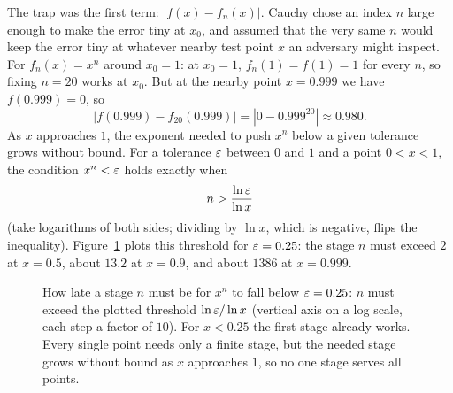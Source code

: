 The trap was the first term: $|f(x) - f_n(x)|$. Cauchy chose an index $n$ large enough to make the error tiny at $x_0$, and assumed that the very same $n$ would keep the error tiny at whatever nearby test point $x$ an adversary might inspect. For $f_n(x) = x^n$ around $x_0 = 1$: at $x_0 = 1$, $f_n(1) = f(1) = 1$ for every $n$, so fixing $n = 20$ works at $x_0$. But at the nearby point $x = 0.999$ we have $f(0.999) = 0$, so
\[
|f(0.999) - f_{20}(0.999)| = |0 - 0.999^{20}| \approx 0.980.
\]
As $x$ approaches $1$, the exponent needed to push $x^n$ below a given tolerance grows without bound. For a tolerance $\varepsilon$ between $0$ and $1$ and a point $0 < x < 1$, the condition $x^n < \varepsilon$ holds exactly when
\[
n > \frac{\ln \varepsilon}{\ln x}
\]
(take logarithms of both sides; dividing by $\ln x$, which is negative, flips the inequality). Figure~\ref{fig:qo-stage-needed} plots this threshold for $\varepsilon = 0.25$: the stage $n$ must exceed $2$ at $x = 0.5$, about $13.2$ at $x = 0.9$, and about $1386$ at $x = 0.999$.

\begin{figure}[htbp]
\centering
{}
\caption{How late a stage $n$ must be for $x^n$ to fall below $\varepsilon = 0.25$: $n$ must exceed the plotted threshold $\ln \varepsilon / \ln x$ (vertical axis on a log scale, each step a factor of $10$). For $x < 0.25$ the first stage already works. Every single point needs only a finite stage, but the needed stage grows without bound as $x$ approaches $1$, so no one stage serves all points.}
\label{fig:qo-stage-needed}
\end{figure}

